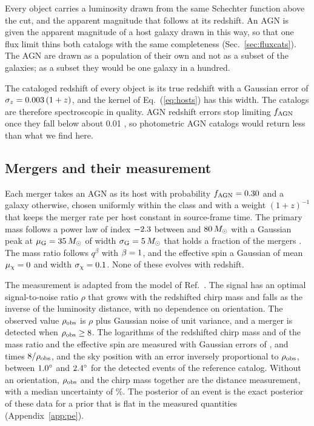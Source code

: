 \documentclass[aps,prd,reprint,twocolumn,superscriptaddress,nofootinbib,floatfix]{revtex4-2}
\newcommand{\msun}{\,M_\odot}
\newcommand{\fagn}{f_{\rm AGN}}
\providecommand{\MockSigLnDL}{\ph{XX}}                 %
\begin{document}
Every object carries a luminosity drawn from the same Schechter function
above the cut, and the apparent magnitude that follows at its redshift. An
AGN is given the apparent magnitude of a host galaxy drawn in this way, so
that one flux limit thins both catalogs with the same completeness
(Sec.~\ref{sec:fluxcats}). The AGN are drawn as a population of their own and
not as a subset of the galaxies; as a subset they would be one galaxy in a
hundred.

The cataloged redshift of every object is its true redshift with a Gaussian
error of $\sigma_z=0.003\,(1+z)$, and the kernel of Eq.~(\ref{eq:hosts})
has this width. The catalogs are therefore spectroscopic in quality. AGN
redshift errors stop limiting $\fagn$ once they fall below about 0.01
\cite{Pouw:2026lar}, so photometric AGN catalogs would return less than what
we find here.

\subsection{Mergers and their measurement}
\label{sec:events}

Each merger takes an AGN as its host with probability $\fagn=\MockfAGN$ and a
galaxy otherwise, chosen uniformly within the class and with a weight
$(1+z)^{-1}$ that keeps the merger rate per host constant in source-frame
time. The primary mass follows a power law of index $-2.3$ between
\MockMmin{} and $\MockMmax\msun$ with a Gaussian peak at $\mu_{\rm
G}=\MockMuG\msun$ of width $\sigma_{\rm G}=\MockSigmaG\msun$ that holds a
fraction \MockPeakFrac{} of the mergers \cite{Talbot:2018cva}. The mass ratio
follows $q^{\beta}$ with $\beta=1$, and the effective spin a Gaussian
of mean $\mu_\chi=0$ and width $\sigma_\chi=0.1$. None of
these evolves with redshift.

The measurement is adapted from the model of Ref.~\cite{Farah:2023vsc}. The
signal
has an optimal signal-to-noise ratio $\rho$ that grows with the redshifted
chirp mass and falls as the inverse of the luminosity distance, with no
dependence on orientation. The observed value $\rho_{\rm obs}$ is $\rho$ plus
Gaussian noise of unit variance, and a merger is detected when $\rho_{\rm
obs}\geq8$. The logarithms of the redshifted chirp mass and of the
mass ratio and the effective spin are measured with Gaussian errors of
\MockSigLnMc, \MockSigLnq{} and \MockSigChi{} times $8/\rho_{\rm
obs}$, and the sky position with an error inversely proportional to
$\rho_{\rm obs}$, between $1.0^\circ$ and $2.4^\circ$ for the
detected events of the reference catalog. Without an orientation, $\rho_{\rm
obs}$ and the chirp mass together are the distance measurement, with a median
uncertainty of \MockSigLnDL\%. The posterior of an event is the exact
posterior of these data for a prior that is flat in the measured
quantities (Appendix~\ref{app:pe}).
\end{document}
